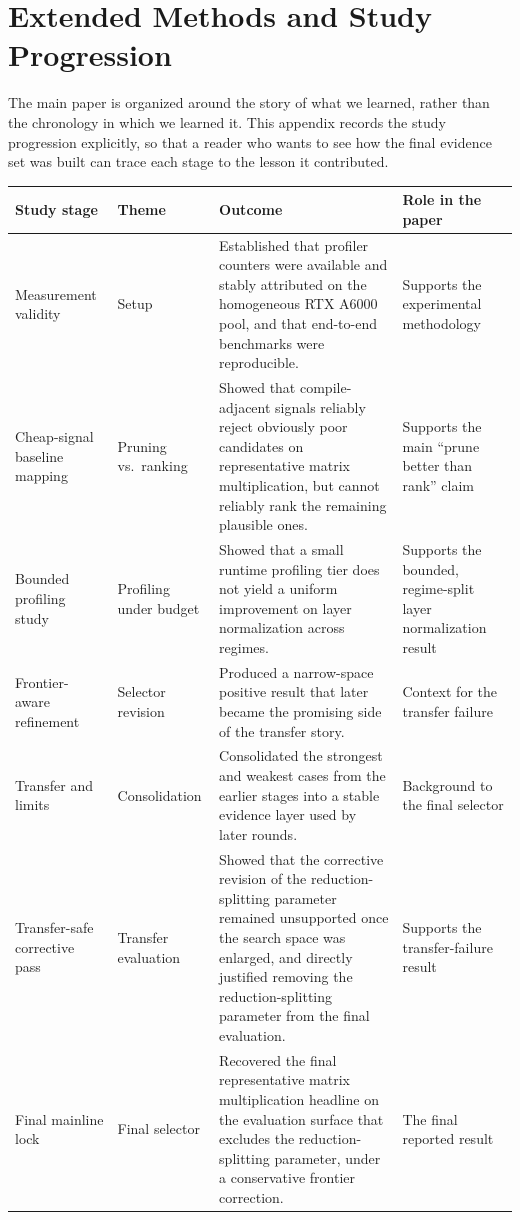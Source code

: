 \section{Extended Methods and Study Progression}

The main paper is organized around the story of what we learned, rather than the chronology in which we learned it. This appendix records the study progression explicitly, so that a reader who wants to see how the final evidence set was built can trace each stage to the lesson it contributed.

\begin{table}[t]
\centering
\small
\begin{tabular}{p{}p{}p{}p{}}
\toprule
Study stage & Theme & Outcome & Role in the paper \\
\midrule
Measurement validity & Setup & Established that profiler counters were available and stably attributed on the homogeneous RTX A6000 pool, and that end-to-end benchmarks were reproducible. & Supports the experimental methodology \\
Cheap-signal baseline mapping & Pruning vs.\ ranking & Showed that compile-adjacent signals reliably reject obviously poor candidates on representative matrix multiplication, but cannot reliably rank the remaining plausible ones. & Supports the main ``prune better than rank'' claim \\
Bounded profiling study & Profiling under budget & Showed that a small runtime profiling tier does not yield a uniform improvement on layer normalization across regimes. & Supports the bounded, regime-split layer normalization result \\
Frontier-aware refinement & Selector revision & Produced a narrow-space positive result that later became the promising side of the transfer story. & Context for the transfer failure \\
Transfer and limits & Consolidation & Consolidated the strongest and weakest cases from the earlier stages into a stable evidence layer used by later rounds. & Background to the final selector \\
Transfer-safe corrective pass & Transfer evaluation & Showed that the corrective revision of the reduction-splitting parameter remained unsupported once the search space was enlarged, and directly justified removing the reduction-splitting parameter from the final evaluation. & Supports the transfer-failure result \\
Final mainline lock & Final selector & Recovered the final representative matrix multiplication headline on the evaluation surface that excludes the reduction-splitting parameter, under a conservative frontier correction. & The final reported result \\

\end{tabular}
\end{table}
